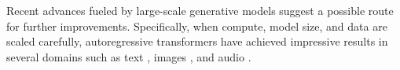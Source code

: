 \documentclass{article}
\begin{document}
Recent advances fueled by large-scale generative models suggest a possible route for further improvements. Specifically, when compute, model size, and data are scaled carefully, autoregressive transformers \citep{vaswani2017attention} have achieved impressive results in several domains such as text \citep{radford2019language}, images \citep{chen2020generative}, and audio \citep{dhariwal2020jukebox}.

\begin{figure}
\centering
\captionsetup[subfigure]{width=1.5in}
\end{figure}
\end{document}
